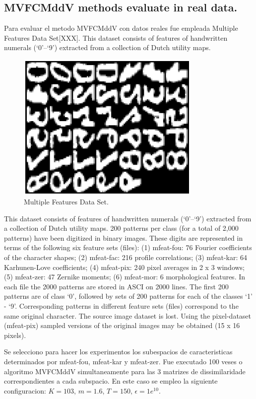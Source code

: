 \documentclass[12pt]{article}
\begin{document}
\subsection{MVFCMddV methods evaluate in real data.}

Para evaluar el metodo  MVFCMddV con datos reales fue empleada Multiple Features Data Set[XXX]. This dataset consists of features of handwritten numerals (`0'--`9') extracted from a collection of Dutch utility maps.

\begin{figure}[h]
\centering
\includegraphics[width=3.5in]{../out/data-base.eps}
\caption{Multiple Features Data Set.}
\label{fig:data_base}
\end{figure}  

This dataset consists of features of handwritten numerals (`0'--`9') extracted from a collection of Dutch utility maps. 200 patterns per class (for a total of 2,000 patterns) have been digitized in binary images. These digits are represented in terms of the following six feature sets (files): (1) mfeat-fou: 76 Fourier coefficients of the character shapes; (2) mfeat-fac: 216 profile correlations; (3) mfeat-kar: 64 Karhunen-Love coefficients; (4) mfeat-pix: 240 pixel averages in 2 x 3 windows; (5) mfeat-zer: 47 Zernike moments; (6) mfeat-mor: 6 morphological features. In each file the 2000 patterns are stored in ASCI on 2000 lines. The first 200 patterns are of class `0', followed by sets of 200 patterns for each of the classes `1' - `9'. Corresponding patterns in different feature sets (files) correspond to the same original character. The source image dataset is lost. Using the pixel-dataset (mfeat-pix) sampled versions of the original images may be obtained (15 x 16 pixels).

Se selecciono para hacer los experimentos los subespacios de caracteristicas determinados por mfeat-fou, mfeat-kar y mfeat-zer. Fue executado 100 veses o algoritmo MVFCMddV simultaneamente para las 3 matrizes de dissimilaridade correspondientes a cada subspacio. En este caso se empleo la siguiente configuracion: $K =103$, $m = 1.6$, $T = 150$, $\epsilon = 1e^{10}$.
\end{document}
